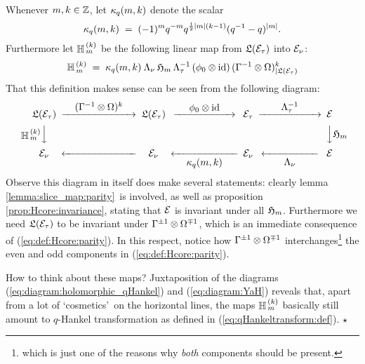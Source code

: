 \begin{defn} \label{def:YaH}
Whenever $m,k\in\mathbb{Z}$, let $\kappa_q(m,k)$ denote the scalar
$$  \kappa_q(m,k) \;=\; (-1)^m q^{-m} q^{\frac{1}{2}|m|(k-1)} (q^{-1}-q)^{|m|}. $$
Furthermore let $\mathbb{H}_{\,m}^{\,(k)}$ be the following linear map from
$\mathfrak{L}(\mathcal E_\tau)$ into $\mathcal E_\nu$:
$$ \mathbb{H}_{\,m}^{\,(k)}  \;=\;   \kappa_q(m,k) \: \Lambda_\nu \, \mathfrak{H}_{m} \, \Lambda_\tau^{-1}\,
         (\phi_0 \otimes \mbox{\rm id})\,(\Gamma^{-1} \otimes \Omega)_{|\mathfrak{L}(\mathcal E_\tau)}^k $$
That this definition makes sense can be seen from the following diagram:
\begin{equation}\label{eq:diagram:YaH}
\begin{CD}
 \calL(\Hcore_\tau)   @>{\textstyle \hspace{1em}(\Gamma^{-1} \tens \Omega)^k\hspace{1em}}>>
 \calL(\Hcore_\tau)   @>{\textstyle\;\hspace{1em} \evzero \tens \id\hspace{1em}\;}>>
 \Hcore_\tau          @>{\textstyle\hspace{2em}\Lambda_\tau^{-1}\hspace{2em}}>>
 \Hcore  \\
 @V{\textstyle\YaH{m}{k}}VV     @. @.
                      @VV{\textstyle \holH{m}}V \\
 \Hcore_\nu   @<<\hspace{7em}<  \Hcore_\nu
              @<<{\textstyle\;\hspace{1em} \kq(m,k) \hspace{1em}\; }<
 \Hcore_\nu   @<<{\textstyle  \hspace{2em} \Lambda_\nu\hspace{2em}}<
       \Hcore
\end{CD}
\end{equation}
Observe this diagram in itself does make several statements:
clearly lemma \ref{lemma:slice_map:parity}\ is involved, as well as
proposition \ref{prop:Hcore:invariance}, stating that $\mathcal E$ is invariant
under all $\mathfrak{H}_{m}$. Furthermore we need $\mathfrak{L}(\mathcal E_\tau)$ to be invariant
under $\Gamma^{\pm 1} \otimes \Omega^{\mp 1}$, which is an immediate consequence of
(\ref{eq:def:Hcore:parity}). In this respect, notice how
$\Gamma^{\pm 1} \otimes \Omega^{\mp 1}$
interchanges\footnote{which is just one of the reasons why {\em both\/}
components should be present.} the even and
odd components in (\ref{eq:def:Hcore:parity}).
\end{defn}


\begin{remark} \rm
How to think about these maps? Juxtaposition of the diagrams
(\ref{eq:diagram:holomorphic_qHankel}) and (\ref{eq:diagram:YaH})
reveals that, apart from a lot of \lq cosmetics\rq\ on the horizontal
lines, the maps $\mathbb{H}_{\,m}^{\,(k)}$ basically still amount to $q$-Hankel transformation
as defined in (\ref{eq:qHankeltransform:def}).
\hfill $\star$
\end{remark}



